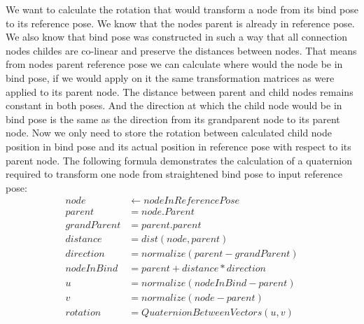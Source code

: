 We want to calculate the rotation that would transform a node from its bind pose to its reference pose.
We know that the nodes parent is already in reference pose.
We also know that bind pose was constructed in such a way that all connection nodes childes are co-linear and preserve the distances between nodes.
That means from nodes parent reference pose we can calculate where would the node be in bind pose, if we would apply on it the same transformation matrices as were applied to its parent node.
The distance between parent and child nodes remains constant in both poses. And the direction at which the child node would be in bind pose is the same as the direction from its grandparent node to its parent node.
Now we only need to store the rotation between calculated child node position in bind pose and its actual position in reference pose with respect to its parent node.
The following formula demonstrates the calculation of a quaternion required to transform one node from straightened bind pose to input reference pose:
\begin{align*}
node& \leftarrow nodeInReferencePose \\
parent& = node.Parent \\
grandParent& = parent.parent \\
distance& = dist(node, parent) \\
direction& = normalize(parent - grandParent) \\
nodeInBind& = parent + distance * direction \\
u& = normalize(nodeInBind - parent) \\
v& = normalize(node - parent) \\
rotation& = QuaternionBetweenVectors(u, v)
\end{align*}



